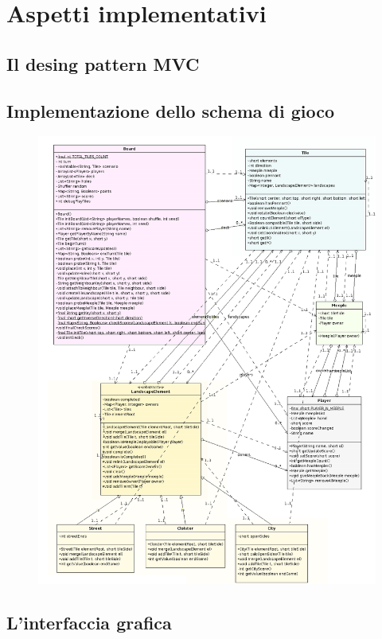 \section{Aspetti implementativi}



\subsection{Il desing pattern MVC}

\subsection{Implementazione dello schema di gioco}

\begin{figure}
\includegraphics[width=\textwidth]{img/modelClassDiagram.png}
\end{figure}

\subsection{L'interfaccia grafica}
